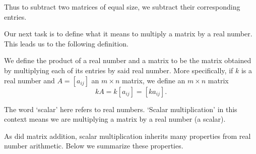 Thus to subtract two matrices of equal size, we subtract their corresponding entries.


\smallskip
Our next task is to define what it means to multiply a matrix by a real number. This leads us to the following definition.  

\smallskip


	
\begin{definition} \label{scalarmultmatrix}  
We define the product of a real number and a matrix to be the matrix obtained by multiplying each of its entries by said real number.  More specifically, if $k$ is a real number and $A=\left[a_{ij}\right]$ an $m\times n$ matrix, we define an $m\times n$ matrix \[kA = k\left[a_{ij}\right] = \left[ka_{ij}\right].\]
\end{definition}
	
The word `scalar' here refers to real numbers.  `Scalar multiplication' in this context means we are multiplying a matrix by a real number (a scalar).

\smallskip

As did matrix addition, scalar multiplication inherits many properties from real number arithmetic.  Below we summarize these properties.

\smallskip

